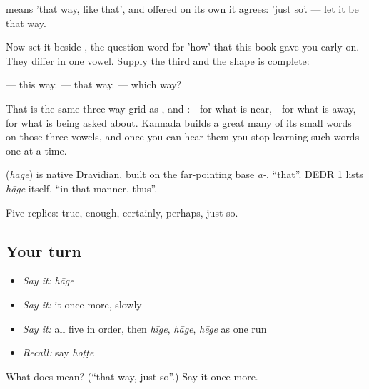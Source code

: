  means 'that way, like that', and offered on its own it agrees: 'just so'.   — let it be that way.

Now set it beside , the question word for 'how' that this book gave you early on. They differ in one vowel. Supply the third and the shape is complete:

 — this way.  — that way.  — which way?

That is the same three-way grid as ,  and : - for what is near, - for what is away, - for what is being asked about. Kannada builds a great many of its small words on those three vowels, and once you can hear them you stop learning such words one at a time.

\begin{cousinweb}
\textbf{} (\emph{hāge}) is native Dravidian, built on the far-pointing base \emph{a-}, \textquotedblleft{}that\textquotedblright{}. DEDR 1 lists \emph{hāge} itself, \textquotedblleft{}in that manner, thus\textquotedblright{}.
\end{cousinweb}

\begin{grammarlens}[title={What you've built}]
Five replies: true, enough, certainly, perhaps, just so.
\end{grammarlens}

\subsection*{Your turn}
\begin{itemize}
\raggedright
  \item \emph{Say it:} \emph{hāge}
  \item \emph{Say it:} it once more, slowly
  \item \emph{Say it:} all five in order, then \emph{hīge}, \emph{hāge}, \emph{hēge} as one run
  \item \emph{Recall:} say \emph{hoṭṭe}
\end{itemize}

\begin{tcolorbox}[breakable,colback=teal!4,colframe=teal!35!black,title={Before you move on}]
What does  mean? (\textquotedblleft{}that way, just so\textquotedblright{}.) Say it once more.
\end{tcolorbox}
